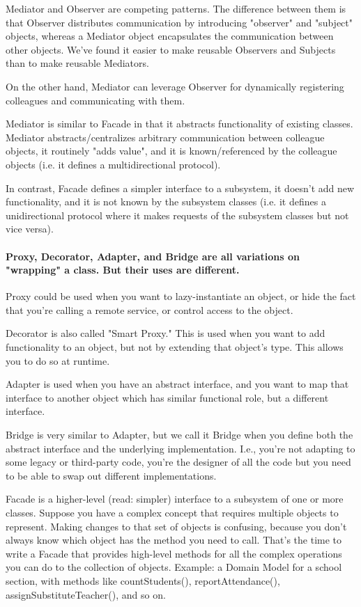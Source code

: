 \documentclass{book}
\begin{document}
    Mediator and Observer are competing patterns.
    The difference between them is that Observer distributes communication by introducing "observer" and "subject" objects, whereas a Mediator object encapsulates the communication between other objects.
    We've found it easier to make reusable Observers and Subjects than to make reusable Mediators.

    On the other hand, Mediator can leverage Observer for dynamically registering colleagues and communicating with them.

    Mediator is similar to Facade in that it abstracts functionality of existing classes.
    Mediator abstracts/centralizes arbitrary communication between colleague objects, it routinely "adds value",
    and it is known/referenced by the colleague objects (i.e. it defines a multidirectional protocol).
    
    In contrast, Facade defines a simpler interface to a subsystem, it doesn't add new functionality, and it is not known
    by the subsystem classes (i.e. it defines a unidirectional protocol where it makes requests of the subsystem classes but not vice versa).

\paragraph{Proxy, Decorator, Adapter, and Bridge are all variations on "wrapping" a class. But their uses are different.}

    Proxy could be used when you want to lazy-instantiate an object, or hide the fact that you're calling a remote service, or control access to the object.

    Decorator is also called "Smart Proxy." This is used when you want to add functionality to an object, but not by extending that object's type. This allows you to do so at runtime.

    Adapter is used when you have an abstract interface, and you want to map that interface to another object which has similar functional role, but a different interface.

    Bridge is very similar to Adapter, but we call it Bridge when you define both the abstract interface and the underlying implementation.
    I.e., you're not adapting to some legacy or third-party code, you're the designer of all the code but you need to be able to swap out different implementations.

    Facade is a higher-level (read: simpler) interface to a subsystem of one or more classes. Suppose you have a complex concept that requires multiple objects to represent. Making changes to that set of objects is confusing, because you don't always know which object has the method you need to call. That's the time to write a Facade that provides high-level methods for all the complex operations you can do to the collection of objects. Example: a Domain Model for a school section, with methods like countStudents(), reportAttendance(), assignSubstituteTeacher(), and so on.
\end{document}
